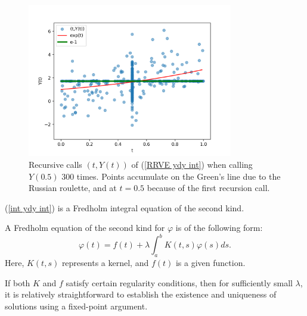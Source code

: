 \documentclass[a4paper,12pt]{article}
\begin{document}
\begin{example}[$y_t=y$ average condition]
  \begin{figure}[h!]
    \centering
    \includegraphics[width=0.8\textwidth]{plots/ydy_int.png}
    \caption{Recursive calls $(t,Y(t))$ of (\ref{RRVE ydy int}) when
      calling $Y(0.5)$ $300$ times. Points accumulate on
      the Green's line due to the Russian roulette,
      and at  $t=0.5$ because of the first recursion call.
    }
    \label{fig:ydy int}
  \end{figure}

\end{example}

(\ref{int ydy int}) is a Fredholm integral
equation of the second kind.

\begin{definition}
  A Fredholm equation of the second kind for $\varphi$  is of the following form:
  \begin{equation}
    \varphi(t)=f(t)+\lambda \int_a^b K(t, s) \varphi(s) ds.
  \end{equation}
  Here, $K(t, s)$ represents a kernel, and $f(t)$ is a given function.
\end{definition}

If both $K$ and $f$ satisfy certain regularity conditions, then for sufficiently
small $\lambda$, it is relatively straightforward to establish the existence
and uniqueness of solutions using a fixed-point argument.
\end{document}
